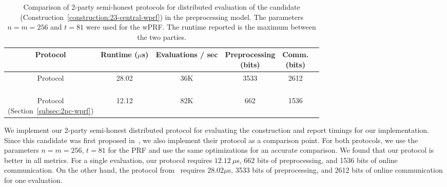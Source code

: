 
\begin{table}[t]
{
\centering
\begin{tabular}{|c|c|c|c|c|c|}
	\hline
	Protocol & Runtime ($\mu$s) & Evaluations / sec & \makecell{Preprocessing \\ (bits)} & \makecell{Comm. \\ (bits)} \\
	\hline
	\hline
	\makecell{\ttwPRF Protocol \\~\cite{boneh2018-darkmatter}} & 28.02 & 36K & 3533 & 2612 \\
	\hline
	\makecell{\ttwPRF Protocol \\ (Section~\ref{subsec:2pc-wprf})} & 12.12 & 82K & 662 & 1536 \\
	\hline	
\end{tabular}
		
\caption{Comparison of 2-party semi-honest protocols for distributed evaluation of the \ttwPRF candidate (Construction~\ref{construction:23-central-wprf}) in the preprocessing model. The parameters $n=m=256$ and $t=81$ were used for the wPRF. The runtime reported is the maximum between the two parties.}
\label{table:distributed_wprf}
}
\end{table}
\else
We implement our 2-party semi-honest distributed protocol for evaluating the \ttwPRF construction and report timings for our implementation. Since this candidate was first proposed in~\cite{boneh2018-darkmatter}, we also implement their protocol as a comparison point. For both protocols, we use the parameters $n=m=256$, $t=81$ for the PRF and use the same optimizations for an accurate comparison. We found that our protocol is better in all metrics. For a single evaluation, our protocol requires $12.12~\mu$s, 662 bits of preprocessing, and 1536 bits of online communication. On the other hand, the protocol from~\cite{boneh2018-darkmatter} requires $28.02\mu$s, 3533 bits of preprocessing, and 2612 bits of online communication for one evaluation.

